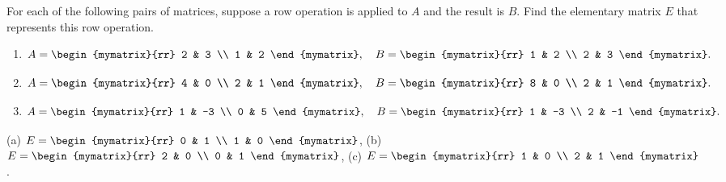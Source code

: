 \begin{ex}
  For each of the following pairs of matrices, suppose a row operation
  is applied to $A$ and the result is $B$. Find the elementary matrix
  $E$ that represents this row operation.
  \begin{enumerate}
  \item
    \begin{equation*}
      A = \begin{mymatrix}{rr}
        2 & 3 \\
        1 & 2
      \end{mymatrix},
      \quad
      B = \begin{mymatrix}{rr}
        1 & 2 \\
        2 & 3
      \end{mymatrix}.
    \end{equation*}
  \item
    \begin{equation*}
      A = \begin{mymatrix}{rr}
        4 & 0 \\
        2 & 1
      \end{mymatrix},
      \quad
      B = \begin{mymatrix}{rr}
        8 & 0 \\
        2 & 1
      \end{mymatrix}.
    \end{equation*}
  \item
    \begin{equation*}
      A = \begin{mymatrix}{rr}
        1 & -3 \\
        0 & 5
      \end{mymatrix},
      \quad
      B = \begin{mymatrix}{rr}
        1 & -3 \\
        2 & -1
      \end{mymatrix}.
    \end{equation*}
  \end{enumerate}
  \begin{sol}
    (a) $E = \begin{mymatrix}{rr}
      0 & 1 \\
      1 & 0
    \end{mymatrix}$,
    (b) $E = \begin{mymatrix}{rr}
      2 & 0 \\
      0 & 1
    \end{mymatrix}$,
    (c) $E = \begin{mymatrix}{rr}
      1 & 0 \\
      2 & 1
    \end{mymatrix}$.
  \end{sol}
\end{ex}
